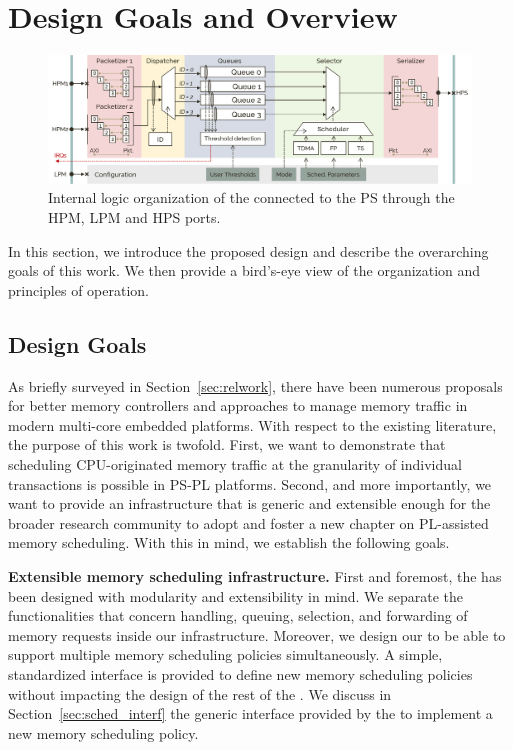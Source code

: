 \section{Design Goals and Overview}\label{sec:overview}

\begin{figure}
  \centering
  \includegraphics[width=1\textwidth]{images/SchIM_diagram.png}
  \caption{Internal logic organization of the \schim connected to the
    PS through the HPM, LPM and HPS ports.}
  \label{fig:MemorEDF_module_schema}
\end{figure}

In this section, we introduce the proposed \schim design and describe
the overarching goals of this work. We then provide a bird's-eye view
of the \schim organization and principles of operation.

\subsection{Design Goals}\label{sec:design_goals}
As briefly surveyed in Section~\ref{sec:relwork}, there have been
numerous proposals for better memory controllers and approaches to
manage memory traffic in modern multi-core embedded platforms. With
respect to the existing literature, the purpose of this work is
twofold. First, we want to demonstrate that scheduling CPU-originated
memory traffic at the granularity of individual transactions is
possible in PS-PL platforms. Second, and more importantly, we want to
provide an infrastructure that is generic and extensible enough for
the broader research community to adopt and foster a new chapter on
PL-assisted memory scheduling. With this in mind, we establish the
following goals.

\par{\bf Extensible memory scheduling infrastructure.} First and
foremost, the \schim has been designed with modularity and
extensibility in mind. We separate the functionalities that concern
handling, queuing, selection, and forwarding of memory requests inside
our infrastructure. Moreover, we design our \schim to be able to support multiple memory scheduling policies simultaneously. A simple,
standardized interface is provided to define new memory scheduling
policies without impacting the design of the rest of the \schim. We
discuss in Section~\ref{sec:sched_interf} the generic interface
provided by the \schim to implement a new memory scheduling policy.

